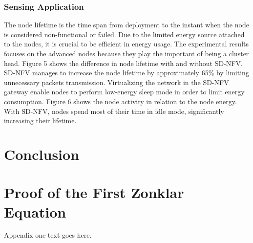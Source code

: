 \documentclass[10pt,journal,compsoc]{IEEEtran}
\begin{document}
\subsubsection{Sensing Application}

The node lifetime is the time span from deployment to the instant when 
the node is considered non-functional or failed. Due to the limited 
energy source attached to the nodes, it is crucial to be efficient 
in energy usage. The experimental results focuses on the advanced nodes 
because they play the important of being a cluster head. Figure 5 
shows the difference in node lifetime with and without SD-NFV. 
SD-NFV manages to increase the node lifetime by approximately 65\% 
by limiting unnecessary packets transmission. Virtualizing the network 
in the SD-NFV gateway enable nodes to perform low-energy sleep mode in 
order to limit energy consumption. Figure 6 shows the node activity 
in relation to the node energy. With SD-NFV, nodes spend most of their 
time in idle mode, significantly increasing their lifetime.

\section{Conclusion}\label{sec:conclusion}


\appendices
\section{Proof of the First Zonklar Equation}
Appendix one text goes here.

\end{document}
